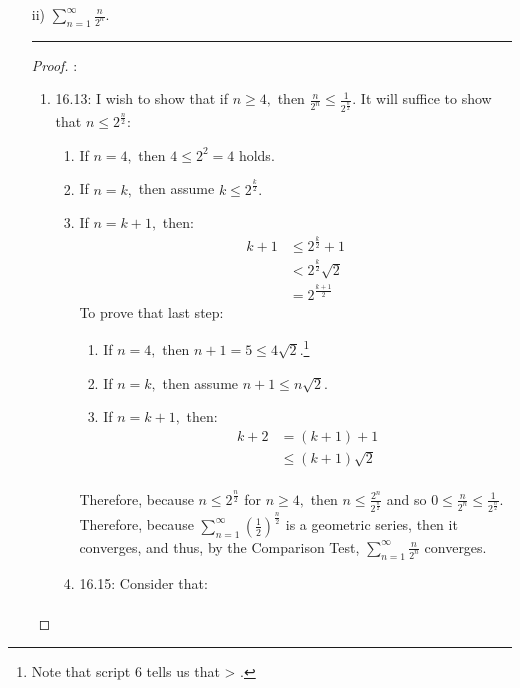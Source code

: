 \documentclass[openany, amssymb, psamsfonts]{amsart}
\theoremstyle{definition}
\numberwithin{equation}{section}
\begin{document}
\begin{enumerate}
\begin{enumerate}
\begin{enumerate}
\item[ii)] $\displaystyle \sum_{n=1}^\infty \frac{n}{2^n}.$
\vspace{4pt}     \hrule   \vspace{4pt}\begin{proof}:\\
    \begin{enumerate}
        \item 16.13: I wish to show that if $n\geq 4,$ then $\frac{n}{2^n}\leq \frac{1}{2^{\frac{n}{2}}}.$ It will suffice to show that $n\leq 2^{\frac{n}{2}}:$
        \begin{enumerate}
            \item If $n = 4,$ then $4 \leq 2^2 = 4$ holds.
            \item If $n = k,$ then assume $k\leq 2^{\frac{k}{2}}.$
            \item If $n = k+1,$ then:
            \begin{align*}
                k+1 &\leq 2^{\frac{k}{2}} + 1\\
                &<2^\frac{k}{2}\sqrt{2}\\
                &= 2^\frac{k+1}{2}
            \end{align*}
            To prove that last step:
            \begin{enumerate}
                \item If $n=4,$ then $n+1 =5 \leq 4\sqrt{2}.$\footnote{Note that script 6 tells us that > .}
                \item If $n=k,$ then assume $n+1 \leq n\sqrt{2}.$
                \item If $n=k+1,$ then:
                \begin{align*}
                    k+2 &= (k+1)+1\\
                    &\leq (k +1)\sqrt{2}\\
                \end{align*}
        \end{enumerate}
        Therefore, because $n\leq 2^{\frac{n}{2}}$ for $n\geq 4,$ then $n \leq \frac{2^{n}}{2^{\frac{n}{2}}}$ and so $0\leq \frac{n}{2^n}\leq \frac{1}{2^{\frac{n}{2}}}.$ Therefore, because $\displaystyle\sum_{n=1}^\infty (\frac{1}{2})^\frac{n}{2}$ is a geometric series, then it converges, and thus, by the Comparison Test, $\displaystyle\sum_{n=1}^\infty \frac{n}{2^n}$ converges.
        \item 16.15: Consider that:
        \begin{align*}

\end{align*}
\end{enumerate}
\end{enumerate}
\end{proof}
\end{enumerate}
\end{enumerate}
\end{enumerate}
\end{document}
